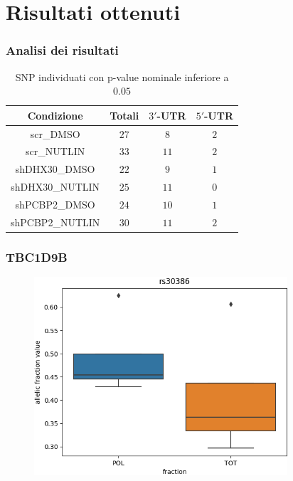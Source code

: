 \documentclass{beamer}
\begin{document}
	\section{Risultati ottenuti}
	\begin{frame}
		\frametitle{Analisi dei risultati}
		\begin{table}[H]
			\begin{tabular}{|c|c|c|c|}
				\hline
				Condizione & Totali & $3'$-UTR & $5'$-UTR\\
				\hline
				scr\_DMSO & $27$ & $8$ & $2$\\
				\hline
				scr\_NUTLIN & $33$ & $11$ &$2$\\
				\hline
				shDHX30\_DMSO & $22$ & $9$ & $1$\\
				\hline
				shDHX30\_NUTLIN & $25$ & $11$ & $0$\\
				\hline
				shPCBP2\_DMSO & $24$ & $10$ & $1$\\
				\hline
				shPCBP2\_NUTLIN & $30$ & $11$ & $2$\\
				\hline
			\end{tabular}
			\caption{SNP individuati con p-value nominale inferiore a $0.05$}
		\end{table}
	\end{frame}
	\begin{frame}
		\frametitle{TBC1D9B}
		\begin{figure}
			\includegraphics[width=0.84\textwidth]{media/scr_NUTLIN_rs30386.png}
		\end{figure}
	\end{frame}
\end{document}
